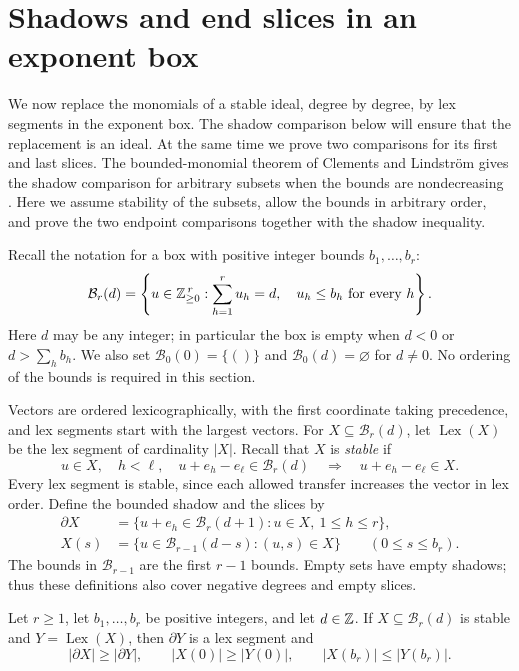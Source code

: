\section{Shadows and end slices in an exponent box}
\label{sec:boxes}

We now replace the monomials of a stable ideal, degree by degree, by
lex segments in the exponent box.  The shadow comparison below will
ensure that the replacement is an ideal.  At the same time we prove
two comparisons for its first and last slices.
The bounded-monomial theorem of Clements and Lindstr\"om gives the shadow
comparison for arbitrary subsets when the bounds are nondecreasing
\cite{CL}.  Here we assume stability of the subsets, allow the bounds in
arbitrary order, and prove the two endpoint comparisons together with
the shadow inequality.

Recall the notation for a box with positive integer bounds
\(b_1,\ldots,b_r\):
\[
 \mathcal B_r(d)=
 \left\{u\in\mathbb Z_{\ge0}^{\,r}:
       \sum_{h=1}^r u_h=d,\quad u_h\le b_h\text{ for every }h\right\}.
\]
Here \(d\) may be any integer; in particular the box is empty when
\(d<0\) or \(d>\sum_h b_h\).  We also set
\(\mathcal B_0(0)=\{()\}\) and \(\mathcal B_0(d)=\varnothing\) for
\(d\ne0\).  No ordering of the bounds is required in this section.

Vectors are ordered lexicographically, with the first coordinate
taking precedence, and lex segments start with the largest vectors.
For \(X\subseteq\mathcal B_r(d)\), let
\(\operatorname{Lex}(X)\) be the lex segment of cardinality \(|X|\).
Recall that \(X\) is \emph{stable} if
\[
 u\in X,\quad h<\ell,\quad
 u+e_h-e_\ell\in\mathcal B_r(d)
 \quad\Longrightarrow\quad u+e_h-e_\ell\in X.
\]
Every lex segment is stable, since each allowed transfer increases
the vector in lex order.  Define the bounded shadow and the slices by
\[
 \begin{split}
 \partial X
   &=\{u+e_h\in\mathcal B_r(d+1):u\in X,\ 1\le h\le r\},\\
 X(s)
   &=\{u\in\mathcal B_{r-1}(d-s):(u,s)\in X\}
       \qquad(0\le s\le b_r).
 \end{split}
\]
The bounds in \(\mathcal B_{r-1}\) are the first \(r-1\) bounds.
Empty sets have empty shadows; thus these definitions also cover
negative degrees and empty slices.

\begin{lemma}
\label{box:inequalities}
Let \(r\ge1\), let \(b_1,\ldots,b_r\) be positive integers, and let
\(d\in\mathbb Z\).  If \(X\subseteq\mathcal B_r(d)\) is stable and
\(Y=\operatorname{Lex}(X)\), then \(\partial Y\) is a lex segment and
\begin{equation}
 \label{box:three-inequalities}
 |\partial X|\ge|\partial Y|,
 \qquad |X(0)|\ge|Y(0)|,
 \qquad |X(b_r)|\le|Y(b_r)|.
\end{equation}
\end{lemma}

